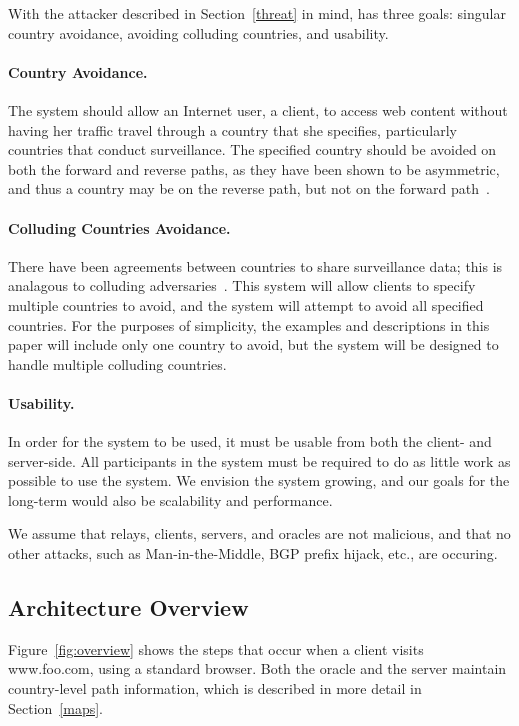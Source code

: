With the attacker described in Section~\ref{threat} in mind, \system{} has three goals: singular country avoidance, avoiding colluding countries, and usability.  

\paragraph{Country Avoidance.}  The system should allow an Internet user, a client, to access web content without having her traffic travel through a country that she specifies, particularly countries that conduct surveillance.  The specified country should be avoided on both the forward and reverse paths, as they have been shown to be asymmetric, and thus a country may be on the reverse path, but not on the forward path~\cite{he2005routing}.  

\paragraph{Colluding Countries Avoidance.}  There have been agreements between countries to share surveillance data; this is analagous to colluding adversaries~\cite{fiveeyes}.  This system will allow clients to specify multiple countries to avoid, and the system will attempt to avoid all specified countries.  For the purposes of simplicity, the examples and descriptions in this paper will include only one country to avoid, but the system will be designed to handle multiple colluding countries.

\paragraph{Usability.} In order for the system to be used, it must be usable from both the client- and server-side.  All participants in the system must be required to do as little work as possible to use the system.  We envision the system growing, and our goals for the long-term would also be scalability and performance.

We assume that relays, clients, servers, and oracles are not malicious, and that no other attacks, such as Man-in-the-Middle, BGP prefix hijack, etc., are occuring.

\subsection{Architecture Overview}

Figure~\ref{fig:overview} shows the steps that occur when a client visits www.foo.com, using a standard browser. Both the oracle and the server maintain country-level path information, which is described in more detail in Section~\ref{maps}.

